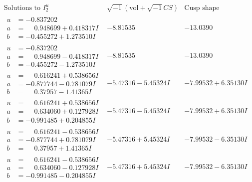 \documentclass[1p]{elsarticle_modified}
\theoremstyle{definition}
\newcommand{\I}{\sqrt{-1}}
\begin{document}
$$\begin{array}{c|c|c}  
\text{Solutions to }I^u_{2}& \I (\text{vol} + \sqrt{-1}CS) & \text{Cusp shape}\\
 \hline 
\begin{aligned}
u &= -0.837202\phantom{ +0.000000I} \\
a &= \phantom{-}0.948699 + 0.418317 I \\
b &= -0.455272 + 1.273510 I\end{aligned}
 & -8.81535\phantom{ +0.000000I} & -13.0390\phantom{ +0.000000I} \\ \hline\begin{aligned}
u &= -0.837202\phantom{ +0.000000I} \\
a &= \phantom{-}0.948699 - 0.418317 I \\
b &= -0.455272 - 1.273510 I\end{aligned}
 & -8.81535\phantom{ +0.000000I} & -13.0390\phantom{ +0.000000I} \\ \hline\begin{aligned}
u &= \phantom{-}0.616241 + 0.538656 I \\
a &= -0.877744 - 0.781079 I \\
b &= \phantom{-}0.37957 - 1.41365 I\end{aligned}
 & -5.47316 - 5.45324 I & -7.99532 + 6.35130 I \\ \hline\begin{aligned}
u &= \phantom{-}0.616241 + 0.538656 I \\
a &= \phantom{-}0.634060 + 0.127928 I \\
b &= -0.991485 + 0.204855 I\end{aligned}
 & -5.47316 - 5.45324 I & -7.99532 + 6.35130 I \\ \hline\begin{aligned}
u &= \phantom{-}0.616241 - 0.538656 I \\
a &= -0.877744 + 0.781079 I \\
b &= \phantom{-}0.37957 + 1.41365 I\end{aligned}
 & -5.47316 + 5.45324 I & -7.99532 - 6.35130 I \\ \hline\begin{aligned}
u &= \phantom{-}0.616241 - 0.538656 I \\
a &= \phantom{-}0.634060 - 0.127928 I \\
b &= -0.991485 - 0.204855 I\end{aligned}
 & -5.47316 + 5.45324 I & -7.99532 - 6.35130 I \\ \hline\begin{aligned}

\end{aligned}
\end{array}$$
\end{document}
